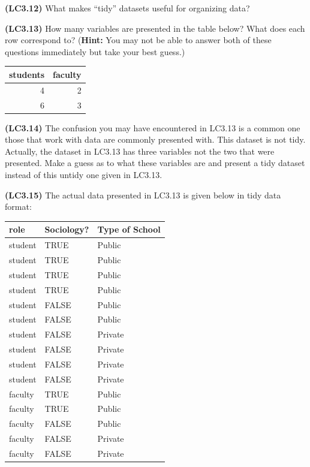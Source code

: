 \documentclass[]{tufte-book}
\begin{document}
\textbf{(LC3.12)} What makes ``tidy'' datasets useful for organizing
data?

\textbf{(LC3.13)} How many variables are presented in the table below?
What does each row correspond to? (\textbf{Hint:} You may not be able to
answer both of these questions immediately but take your best guess.)

\begin{tabular}{r|r}
\hline
students & faculty\\
\hline
4 & 2\\
\hline
6 & 3\\
\hline
\end{tabular}

\textbf{(LC3.14)} The confusion you may have encountered in LC3.13 is a
common one those that work with data are commonly presented with. This
dataset is not tidy. Actually, the dataset in LC3.13 has three variables
not the two that were presented. Make a guess as to what these variables
are and present a tidy dataset instead of this untidy one given in
LC3.13.

\textbf{(LC3.15)} The actual data presented in LC3.13 is given below in
tidy data format:

\begin{tabular}{l|l|l}
\hline
role & Sociology? & Type of School\\
\hline
student & TRUE & Public\\
\hline
student & TRUE & Public\\
\hline
student & TRUE & Public\\
\hline
student & TRUE & Public\\
\hline
student & FALSE & Public\\
\hline
student & FALSE & Public\\
\hline
student & FALSE & Private\\
\hline
student & FALSE & Private\\
\hline
student & FALSE & Private\\
\hline
student & FALSE & Private\\
\hline
faculty & TRUE & Public\\
\hline
faculty & TRUE & Public\\
\hline
faculty & FALSE & Public\\
\hline
faculty & FALSE & Private\\
\hline
faculty & FALSE & Private\\
\hline
\end{tabular}
\end{document}
